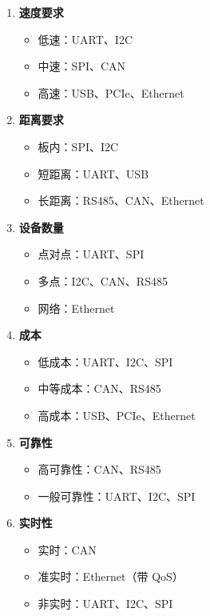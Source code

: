 \begin{enumerate}
  \item \textbf{速度要求}
    \begin{itemize}
      \item 低速：UART、I2C
      \item 中速：SPI、CAN
      \item 高速：USB、PCIe、Ethernet
    \end{itemize}

  \item \textbf{距离要求}
    \begin{itemize}
      \item 板内：SPI、I2C
      \item 短距离：UART、USB
      \item 长距离：RS485、CAN、Ethernet
    \end{itemize}

  \item \textbf{设备数量}
    \begin{itemize}
      \item 点对点：UART、SPI
      \item 多点：I2C、CAN、RS485
      \item 网络：Ethernet
    \end{itemize}

  \item \textbf{成本}
    \begin{itemize}
      \item 低成本：UART、I2C、SPI
      \item 中等成本：CAN、RS485
      \item 高成本：USB、PCIe、Ethernet
    \end{itemize}

  \item \textbf{可靠性}
    \begin{itemize}
      \item 高可靠性：CAN、RS485
      \item 一般可靠性：UART、I2C、SPI
    \end{itemize}

  \item \textbf{实时性}
    \begin{itemize}
      \item 实时：CAN
      \item 准实时：Ethernet（带 QoS）
      \item 非实时：UART、I2C、SPI
    \end{itemize}
\end{enumerate}

